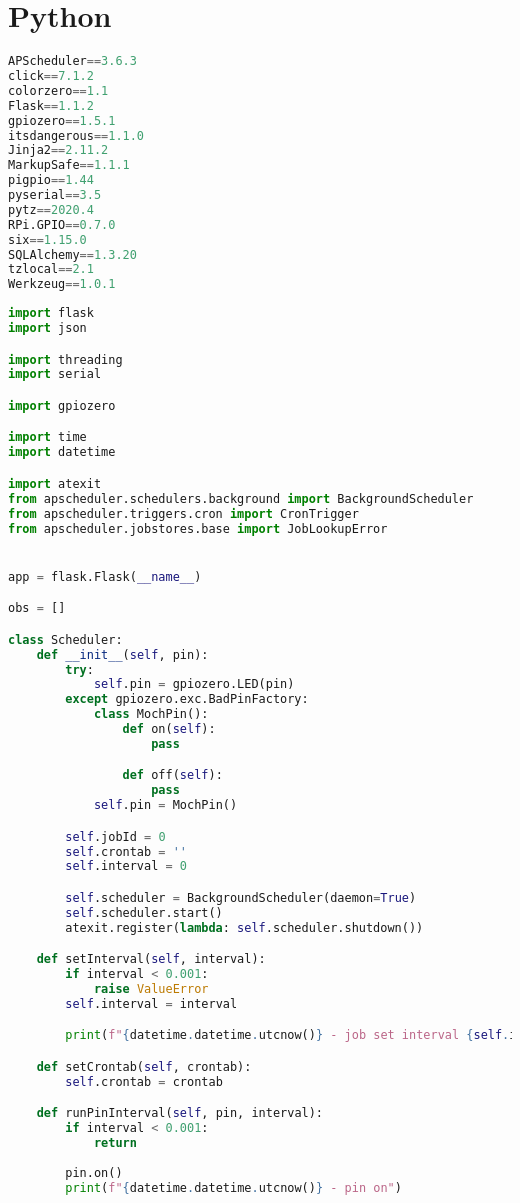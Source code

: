 \documentclass[a4paper,12pt,twoside,openright,titlepage]{book}
\begin{document}
\section{Python}
\begin{lstlisting}[title={raspberrypi/api/requirements.py}, language=Python]
APScheduler==3.6.3
click==7.1.2
colorzero==1.1
Flask==1.1.2
gpiozero==1.5.1
itsdangerous==1.1.0
Jinja2==2.11.2
MarkupSafe==1.1.1
pigpio==1.44
pyserial==3.5
pytz==2020.4
RPi.GPIO==0.7.0
six==1.15.0
SQLAlchemy==1.3.20
tzlocal==2.1
Werkzeug==1.0.1
\end{lstlisting}

\begin{lstlisting}[title={raspberrypi/api/data.py}, language=Python]
import flask
import json

import threading
import serial

import gpiozero

import time
import datetime

import atexit
from apscheduler.schedulers.background import BackgroundScheduler
from apscheduler.triggers.cron import CronTrigger
from apscheduler.jobstores.base import JobLookupError


app = flask.Flask(__name__)

obs = []

class Scheduler:
    def __init__(self, pin):
        try:
            self.pin = gpiozero.LED(pin)
        except gpiozero.exc.BadPinFactory:
            class MochPin():
                def on(self):
                    pass

                def off(self):
                    pass
            self.pin = MochPin()

        self.jobId = 0
        self.crontab = ''
        self.interval = 0

        self.scheduler = BackgroundScheduler(daemon=True)
        self.scheduler.start()
        atexit.register(lambda: self.scheduler.shutdown())

    def setInterval(self, interval):
        if interval < 0.001:
            raise ValueError
        self.interval = interval

        print(f"{datetime.datetime.utcnow()} - job set interval {self.interval}")

    def setCrontab(self, crontab):
        self.crontab = crontab

    def runPinInterval(self, pin, interval):
        if interval < 0.001:
            return
        
        pin.on()
        print(f"{datetime.datetime.utcnow()} - pin on")
        

\end{lstlisting}
\end{document}
